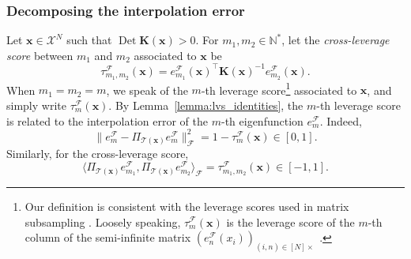 \documentclass[twoside,11pt]{book}
\DeclareMathOperator{\Det}{Det}
\DeclareMathOperator{\Tran}{\intercal}
\DeclareMathOperator{\F}{\mathcal{F}}
\DeclareMathOperator{\Ns}{\mathbb{N}^{*}}
\newcommand{\rb}[1]{\textcolor{magenta}{#1}}
\begin{document}
\subsubsection{Decomposing the interpolation error}
\label{sec:decomposition_error}
Let $\bm{x} \in \mathcal{X}^{N}$ such that $\Det \bm{K}(\bm{x}) > 0$. For $m_{1}, m_{2} \in \mathbb{N}^{*}$, let the \emph{cross-leverage score} between $m_{1}$ and $m_{2}$ associated to $\bm{x}$ be
\begin{equation}\label{eq:cross_lvs_def}
\tau_{m_{1},m_{2}}^{\F}(\bm{x}) = e_{m_{1}}^{\F}(\bm{x})^{\Tran} \bm{K}(\bm{x})^{-1} e_{m_{2}}^{\F}(\bm{x}).
\end{equation}
When $m_1=m_2=m$, we speak of the $m$-th leverage score\footnote{Our definition is consistent with the leverage scores used in matrix subsampling  \citep{DrMaMu06}. Loosely speaking, $\tau_{m}^{\F}(\bm{x})$ is the leverage score of the $m$-th column of the semi-infinite matrix  $(e_{n}^{\F}(x_{i}))_{(i,n) \in [N] \times \Ns}$.} associated to $\bm{x}$, and simply write $\tau_{m}^{\F}(\bm{x})$.
By Lemma~\ref{lemma:lvs_identities},
 the $m$-th leverage score is related to the interpolation error of the $m$-th eigenfunction $e_{m}^{\F}$. Indeed,
\begin{equation}
\|e_{m}^{\F} - \Pi_{\mathcal{T}(\bm{x})} e_{m}^{\F}\|_{\F}^{2} = 1- \tau_{m}^{\F}(\bm{x}) \in [0,1].
\end{equation}
Similarly, for the cross-leverage score,
\begin{equation}
\langle \Pi_{\mathcal{T}(\bm{x})} e_{m_{1}}^{\F}, \Pi_{\mathcal{T}(\bm{x})} e_{m_{2}}^{\F} \rangle_{\F} = \tau_{m_{1},m_{2}}^{\F}(\bm{x}) \in [-1,1].
\end{equation}
\end{document}
